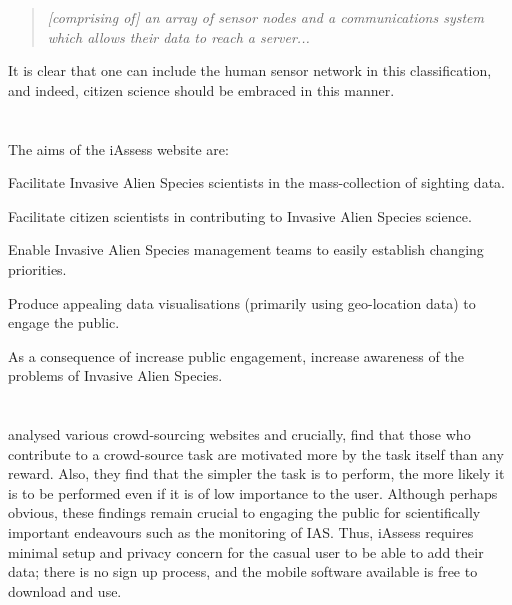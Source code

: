 \documentclass[10pt,psfig,letterpaper,twocolumn]{article}
\begin{document}
\begin{quote}\em{\footnotesize
[comprising of] an array of sensor nodes and a communications system which allows their data to reach a server...
}
\end{quote}

It is clear that one can include the human sensor network in this classification, and indeed, citizen science should be embraced in this manner.


\section*{}

The aims of the iAssess website are:
\begin{enumerate*}
\item Facilitate Invasive Alien Species scientists in the mass-collection of sighting data.
\item Facilitate citizen scientists in contributing to Invasive Alien Species science.
\item Enable Invasive Alien Species management teams to easily establish changing priorities.
\item Produce appealing data visualisations (primarily using geo-location data) to engage the public.
\item As a consequence of increase public engagement, increase awareness of the problems of Invasive Alien Species.
\end{enumerate*}

\section*{}

\citet{Wightman:2010un} analysed various crowd-sourcing websites and crucially, find that those who contribute to a crowd-source task are motivated more by the task itself than any reward.
Also, they find that the simpler the task is to perform, the more likely it is to be performed even if it is of low importance to the user.
Although perhaps obvious, these findings remain crucial to engaging the public for scientifically important endeavours such as the monitoring of IAS.
Thus, iAssess requires minimal setup and privacy concern for the casual user to be able to add their data; there is no sign up process, and the mobile software available is free to download and use.
\end{document}
